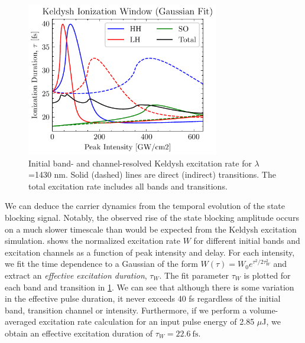 \begin{figure}
	\centering
	\includegraphics[width=0.75\textwidth]{figures/chap4/Keldysh_SingleInt_IonizationWindowFit.pdf}
	\caption{Initial band- and channel-resolved Keldysh excitation rate for $\lambda$=1430 nm. Solid (dashed) lines are direct (indirect) transitions. The total excitation rate includes all bands and transitions.}
	\label{fig:Keldysh_SingleInt_IonizationWindowFit}
\end{figure}

We can deduce the carrier dynamics from the temporal evolution of the state blocking signal. Notably, the observed rise of the state blocking amplitude occurs on a much slower timescale than would be expected from the Keldysh excitation simulation.  shows the normalized excitation rate $W$ for different initial bands and excitation channels as a function of peak intensity and delay. For each intensity, we fit the time dependence to a Gaussian of the form ${W(\tau)=W_0 e^{\tau^2/2\tau_W^2}}$ and extract an \textit{effective excitation duration}, $\tau_W$. The fit parameter $\tau_W$ is plotted for each band and transition in \cref{fig:Keldysh_SingleInt_IonizationWindowFit}. We can see that although there is some variation in the effective pulse duration, it never exceeds 40 fs regardless of the initial band, transition channel or intensity. Furthermore, if we perform a volume-averaged excitation rate calculation for an input pulse energy of 2.85 $\mu$J, we obtain an effective excitation duration of $\tau_W = 22.6 \ \textrm{fs}$.

